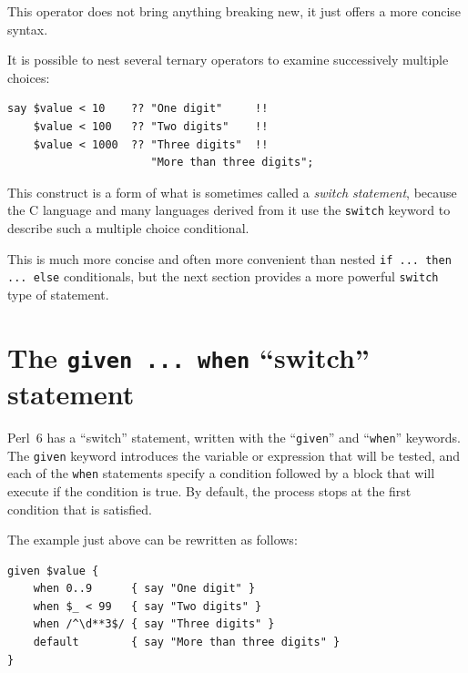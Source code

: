 This operator does not bring anything breaking new, it just offers 
a more concise syntax.

It is possible to nest several ternary operators to examine 
successively multiple choices:

\begin{verbatim}
say $value < 10    ?? "One digit"     !! 
    $value < 100   ?? "Two digits"    !!
    $value < 1000  ?? "Three digits"  !!
                      "More than three digits";
\end{verbatim}

This construct is a form of what is sometimes called a 
\emph{switch statement}, because the C language and 
many languages derived from it use the {\tt switch} keyword 
to describe such a multiple choice conditional.

This is much more concise and often more convenient than nested 
{\tt if ... then ... else} conditionals, but the next section 
provides a more powerful {\tt switch} type of statement.

\section{The {\tt given ... when} ``switch'' statement}
\label{given_when}

Perl~6 has a ``switch'' statement, written with the 
``{\tt given}'' and ``{\tt when}'' keywords. The 
{\tt given} keyword introduces the variable or expression 
that will be tested, and each of the {\tt when} 
statements specify a condition followed by a block that 
will execute if the condition is true. By default, the 
process stops at the first condition that is satisfied.

The example just above can be rewritten as follows:

\begin{verbatim}
given $value {
    when 0..9      { say "One digit" }
    when $_ < 99   { say "Two digits" }
    when /^\d**3$/ { say "Three digits" }
    default        { say "More than three digits" }
}
\end{verbatim}

